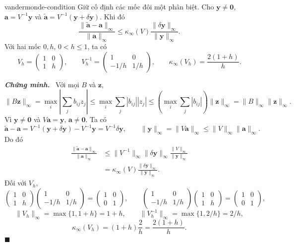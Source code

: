 \documentclass[12pt,a4paper,oneside]{book}
\numberwithin{algorithm}{chapter}
\theoremstyle{definition}
\newenvironment{chungminh}{\par\medskip\noindent\textbf{\textit{\color{mainblue}Chứng minh.}}\ }{\hfill$\blacksquare$\par\medskip}
\begin{document}
\begin{menhde}{}{vandermonde-condition}
Giữ cố định các mốc đôi một phân biệt. Cho $\mathbf y\ne\mathbf0$, $\mathbf a=V^{-1}\mathbf y$ và $\widetilde{\mathbf a}=V^{-1}(\mathbf y+\delta\mathbf y)$. Khi đó
\[
 \frac{\|\widetilde{\mathbf a}-\mathbf a\|_\infty}{\|\mathbf a\|_\infty}
 \leq\kappa_\infty(V)
       \frac{\|\delta\mathbf y\|_\infty}{\|\mathbf y\|_\infty}.
\]
Với hai mốc $0,h$, $0<h\leq1$, ta có
\[
 V_h=\begin{pmatrix}1&0\\1&h\end{pmatrix},\qquad
 V_h^{-1}=\begin{pmatrix}1&0\\-1/h&1/h\end{pmatrix},\qquad
 \kappa_\infty(V_h)=\frac{2(1+h)}h.
\]
\end{menhde}
\begin{chungminh}
Với mọi $B$ và $\mathbf z$,
\[
 \|B\mathbf z\|_\infty
 =\max_i\left|\sum_jb_{ij}z_j\right|
 \leq\max_i\sum_j|b_{ij}||z_j|
 \leq\left(\max_i\sum_j|b_{ij}|\right)\|\mathbf z\|_\infty
 =\|B\|_\infty\|\mathbf z\|_\infty.
\]
Vì $\mathbf y\ne\mathbf0$ và $V\mathbf a=\mathbf y$, $\mathbf a\ne\mathbf0$. Ta có
\[
 \widetilde{\mathbf a}-\mathbf a
 =V^{-1}(\mathbf y+\delta\mathbf y)-V^{-1}\mathbf y
 =V^{-1}\delta\mathbf y,
 \qquad
 \|\mathbf y\|_\infty=\|V\mathbf a\|_\infty
 \leq\|V\|_\infty\|\mathbf a\|_\infty.
\]
Do đó
\begin{align*}
 \frac{\|\widetilde{\mathbf a}-\mathbf a\|_\infty}{\|\mathbf a\|_\infty}
 &\leq\|V^{-1}\|_\infty\|\delta\mathbf y\|_\infty
        \frac{\|V\|_\infty}{\|\mathbf y\|_\infty}\\
 &=\kappa_\infty(V)\frac{\|\delta\mathbf y\|_\infty}{\|\mathbf y\|_\infty}.
\end{align*}
Đối với $V_h$,
\[
 \begin{pmatrix}1&0\\1&h\end{pmatrix}
 \begin{pmatrix}1&0\\-1/h&1/h\end{pmatrix}
 =\begin{pmatrix}1&0\\0&1\end{pmatrix},
 \qquad
 \begin{pmatrix}1&0\\-1/h&1/h\end{pmatrix}
 \begin{pmatrix}1&0\\1&h\end{pmatrix}
 =\begin{pmatrix}1&0\\0&1\end{pmatrix},
\]
\[
 \|V_h\|_\infty=\max\{1,1+h\}=1+h,
 \qquad
 \|V_h^{-1}\|_\infty=\max\{1,2/h\}=2/h,
\]
\[
 \kappa_\infty(V_h)=(1+h)\frac2h=\frac{2(1+h)}h.
\]
\end{chungminh}
\end{document}
